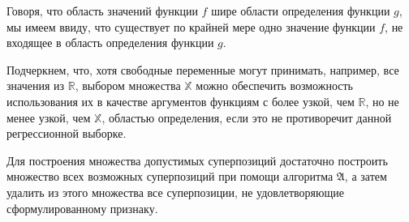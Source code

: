 \documentclass[12pt,a4paper]{article}
\begin{document}
Говоря, что область значений функции $f$ шире области определения функции
$g$, мы имеем ввиду, что существует по крайней мере одно значение функции
$f$, не входящее в область определения функции $g$.

Подчеркнем, что, хотя свободные переменные могут принимать, например, все
значения из $\mathbb{R}$, выбором множества $\mathbb{X}$ можно обеспечить
возможность использования их в качестве аргументов функциям с более узкой,
чем $\mathbb{R}$, но не менее узкой, чем $\mathbb{X}$, областью определения,
если это не противоречит данной регрессионной выборке.

Для построения множества допустимых суперпозиций достаточно построить
множество всех возможных суперпозиций при помощи алгоритма $\mathfrak{A}$,
а затем удалить из этого множества все суперпозиции, не удовлетворяющие
сформулированному признаку.
\end{document}
